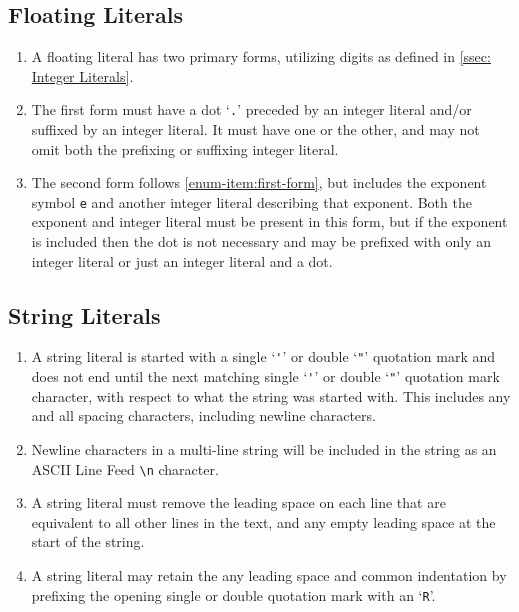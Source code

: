 \subsection{Floating Literals}\label{ssec: Floating Literals}
\begin{enumerate}
	\item A floating literal has two primary forms, utilizing digits as defined in \ref{ssec: Integer Literals}.
	\item \label{enum-item:first-form} The first form must have a dot `\lstinline|.|' preceded by an integer literal and/or suffixed by an integer literal. It must have one or the other, and may not omit both the prefixing or suffixing integer literal.
	\item The second form follows \ref{enum-item:first-form}, but includes the exponent symbol \lstinline|e| and another integer literal describing that exponent. Both the exponent and integer literal must be present in this form, but if the exponent is included then the dot is not necessary and may be prefixed with only an integer literal or just an integer literal and a dot.
\end{enumerate}

\subsection{String Literals}\label{ssec: String Literals}
\begin{enumerate}
	\item A string literal is started with a single `\lstinline|'|' or double `\lstinline|"|' quotation mark and does not end until the next matching single `\lstinline|'|' or double `\lstinline|"|' quotation mark character, with respect to what the string was started with. This includes any and all spacing characters, including newline characters.
	\item Newline characters in a multi-line string will be included in the string as an ASCII Line Feed \lstinline|\n| character.
	\item A string literal must remove the leading space on each line that are equivalent to all other lines in the text, and any empty leading space at the start of the string.
	\item A string literal may retain the any leading space and common indentation by prefixing the opening single or double quotation mark with an `\lstinline|R|'.
\end{enumerate}
